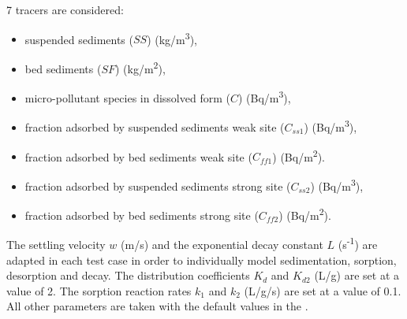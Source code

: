 7 tracers are considered:
\begin{itemize}
\item suspended sediments ($SS$) (kg/m\textsuperscript{3}),
\item bed sediments ($SF$) (kg/m\textsuperscript{2}),
\item micro-pollutant species in dissolved form ($C$) (Bq/m\textsuperscript{3}),
\item fraction adsorbed by suspended sediments weak site ($C_{ss1}$)
  (Bq/m\textsuperscript{3}),
\item fraction adsorbed by bed sediments weak site ($C_{ff1}$)
  (Bq/m\textsuperscript{2}).
\item fraction adsorbed by suspended sediments strong site ($C_{ss2}$)
  (Bq/m\textsuperscript{3}),
\item fraction adsorbed by bed sediments strong site ($C_{ff2}$)
  (Bq/m\textsuperscript{2}).
\end{itemize}

The settling velocity $w$ (m/s) and the exponential decay constant $L$
(s\textsuperscript{-1}) are adapted in each test case in order to individually
model sedimentation, sorption, desorption and decay. The distribution
coefficients $K_d$ and $K_{d2}$ (L/g) are set at a value of 2. The sorption reaction
rates $k_1$ and $k_2$ (L/g/s) are set at a value of 0.1. All other parameters
are taken with the default values in the \waqtel {}.

